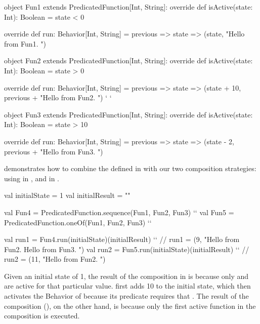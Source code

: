 \begin{scala}[label=lst:predicated-function-creation-example, caption=Predicated Function examples]
object Fun1 extends PredicatedFunction[Int, String]:
  override def isActive(state: Int): Boolean =
    state < 0

  override def run: Behavior[Int, String] = previous => state =>
    (state, "Hello from Fun1. ")

object Fun2 extends PredicatedFunction[Int, String]:
  override def isActive(state: Int): Boolean =
    state > 0

  override def run: Behavior[Int, String] = previous => state =>
    (state + 10, previous + "Hello from Fun2. ") ` \label{ln:predicated-function-creation-example.fun2} `

object Fun3 extends PredicatedFunction[Int, String]:
  override def isActive(state: Int): Boolean =
    state > 10

  override def run: Behavior[Int, String] = previous => state =>
    (state - 2, previous + "Hello from Fun3. ")
\end{scala}

 demonstrates how to combine the  
defined in  with our two composition strategies: using 
 in , and  in 
.

\begin{scala}[label=lst:predicated-function-composition-example, caption=Predicated Function composition examples]
val initialState = 1
val initialResult = ""

val Fun4 = PredicatedFunction.sequence(Fun1, Fun2, Fun3) `\label{ln:predicated-function-composition-example.fun4}`
val Fun5 = PredicatedFunction.oneOf(Fun1, Fun2, Fun3) `\label{ln:predicated-function-composition-example.fun5}`

val run1 = Fun4.run(initialState)(initialResult) `\label{ln:predicated-function-composition-example.run1}`
// run1 = (9, "Hello from Fun2. Hello from Fun3. ")
val run2 = Fun5.run(initialState)(initialResult) `\label{ln:predicated-function-composition-example.run2}`
// run2 = (11, "Hello from Fun2. ")
\end{scala}

Given an initial state of 1, the result of the  composition in 
 is 
 because only  and  are 
active for that particular value.  first adds 10 to the initial state, which then activates the 
Behavior of  because its predicate requires that .
The result of the  composition (), 
on the other hand, is  because only the first active function in the 
composition is executed.

